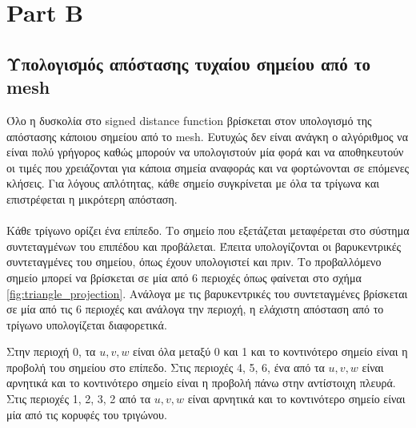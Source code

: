 \documentclass{report}
\begin{document}
\chapter{Part B}

\section{Υπολογισμός απόστασης τυχαίου σημείου από το mesh}
Όλο η δυσκολία στο signed distance function βρίσκεται στον υπολογισμό της απόστασης κάποιου σημείου από το mesh.
Ευτυχώς δεν είναι ανάγκη ο αλγόριθμος να είναι πολύ γρήγορος καθώς μπορούν να υπολογιστούν μία φορά και να
αποθηκευτούν οι τιμές που χρειάζονται για κάποια σημεία αναφοράς και να φορτώνονται σε επόμενες κλήσεις.
Για λόγους απλότητας, κάθε σημείο συγκρίνεται με όλα τα τρίγωνα και επιστρέφεται η μικρότερη απόσταση.
\\\\
Κάθε τρίγωνο ορίζει ένα επίπεδο. Το σημείο που εξετάζεται μεταφέρεται στο σύστημα συντεταγμένων του επιπέδου και προβάλεται.
Έπειτα υπολογίζονται οι βαρυκεντρικές συντεταγμένες του σημείου, όπως έχουν υπολογιστεί και πριν.
Το προβαλλόμενο σημείο μπορεί να βρίσκεται σε μία από 6 περιοχές όπως φαίνεται στο σχήμα \ref{fig:triangle_projection}.
Ανάλογα με τις βαρυκεντρικές του συντεταγμένες βρίσκεται σε μία από τις 6 περιοχές και ανάλογα την περιοχή,
η ελάχιστη απόσταση από το τρίγωνο υπολογίζεται διαφορετικά.

 \label{fig:triangle_projection}

Στην περιοχή 0, τα $u, v, w$ είναι όλα μεταξύ 0 και 1 και το κοντινότερο σημείο είναι η προβολή του σημείου στο επίπεδο.
Στις περιοχές 4, 5, 6, ένα από τα $u, v, w$ είναι αρνητικά και το κοντινότερο σημείο είναι η προβολή πάνω στην
αντίστοιχη πλευρά. Στις περιοχές 1, 2, 3, 2 από τα $u, v, w$ είναι αρνητικά και το κοντινότερο σημείο 
είναι μία από τις κορυφές του τριγώνου.




\clearpage
{}
\end{document}
